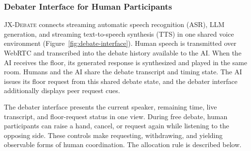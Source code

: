 \documentclass[manuscript,review,anonymous]{acmart}
\begin{document}
\subsubsection{Debater Interface for Human Participants}

\textsc{JX-Debate} connects streaming automatic speech recognition (ASR), LLM generation, and streaming text-to-speech synthesis (TTS) in one shared voice environment (Figure~\ref{fig:debate-interface}). Human speech is transmitted over WebRTC and transcribed into the debate history available to the AI. When the AI receives the floor, its generated response is synthesized and played in the same room. Humans and the AI share the debate transcript and timing state. The AI issues its floor request from this shared debate state, and the debater interface additionally displays peer request cues.

The debater interface presents the current speaker, remaining time, live transcript, and floor-request status in one view. During free debate, human participants can raise a hand, cancel, or request again while listening to the opposing side. These controls make requesting, withdrawing, and yielding observable forms of human coordination. The allocation rule is described below.
\end{document}
